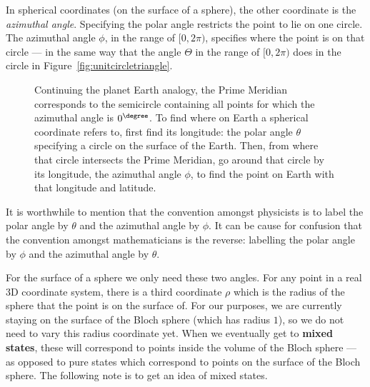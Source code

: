 \documentclass{article}
\def\tikzscale{1.5}
\theoremstyle{definition}
\begin{document}
In spherical coordinates (on the surface of a sphere), the other coordinate is the \textit{azimuthal angle}.  Specifying the polar angle restricts the point to lie on one circle.  The azimuthal angle $\phi$, in the range of $[0,2\pi)$, specifies where the point is on that circle --- in the same way that the angle $\Theta$ in the range of $[0,2\pi)$ does in the circle in Figure~\ref{fig:unitcircletriangle}.
\begin{figure}[H]
	\centering
	\scalebox{\tikzscale}{\tikzfig{latitude}}
	\caption{Continuing the planet Earth analogy, the Prime Meridian corresponds to the semicircle containing all points for which the azimuthal angle is $0^{\degree}$.  To find where on Earth a spherical coordinate refers to, first find its longitude: the polar angle $\theta$ specifying a circle on the surface of the Earth.  Then, from where that circle intersects the Prime Meridian, go around that circle by its longitude, the azimuthal angle $\phi$, to find the point on Earth with that longitude and latitude.}
\end{figure}
It is worthwhile to mention that the convention amongst physicists is to label the polar angle by $\theta$ and the azimuthal angle by $\phi$.  It can be cause for confusion that the convention amongst mathematicians is the reverse: labelling the polar angle by $\phi$ and the azimuthal angle by $\theta$.

For the surface of a sphere we only need these two angles.  For any point in a real 3D coordinate system, there is a third coordinate $\rho$ which is the radius of the sphere that the point is on the surface of.  For our purposes, we are currently staying on the surface of the Bloch sphere (which has radius $1$), so we do not need to vary this radius coordinate yet.  When we eventually get to \textbf{mixed states}, these will correspond to points inside the volume of the Bloch sphere --- as opposed to pure states which correspond to points on the surface of the Bloch sphere.  The following note is to get an idea of mixed states.
\end{document}
